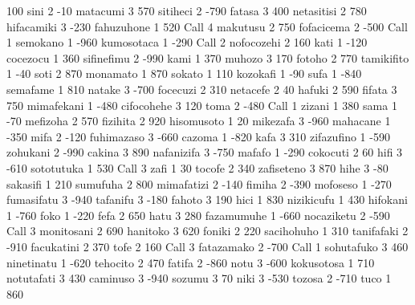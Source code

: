 100
sini 2 -10
matacumi 3 570
sitiheci 2 -790
fatasa 3 400
netasitisi 2 780
hifacamiki 3 -230
fahuzuhone 1 520
Call 4
makutusu 2 750
fofacicema 2 -500
Call 1
semokano 1 -960
kumosotaca 1 -290
Call 2
nofocozehi 2 160
kati 1 -120
cocezocu 1 360
sifinefimu 2 -990
kami 1 370
muhozo      3 170
fotoho      2 770
tamikifito  1 -40
soti        2 870
monamato    1 870
sokato      1 110
kozokafi    1 -90
sufa        1 -840
semafame    1 810
natake      3 -700
focecuzi    2 310
netacefe 2 40
hafuki 2 590
fifata 3 750
mimafekani 1 -480
cifocohehe 3 120
toma 2 -480
Call 1
zizani 1 380
sama 1 -70
mefizoha 2 570
fizihita 2 920
hisomusoto 1 20
mikezafa 3 -960
mahacane 1 -350
mifa 2 -120
fuhimazaso 3 -660
cazoma 1 -820
kafa 3 310
zifazufino 1 -590
zohukani 2 -990
cakina 3 890
nafanizifa 3 -750
mafafo 1 -290
cokocuti 2 60
hifi 3 -610
sototutuka 1 530
Call 3
zafi 1 30
tocofe 2 340
zafiseteno 3 870
hihe 3 -80
sakasifi 1 210
sumufuha 2 800
mimafatizi 2 -140
fimiha 2 -390
mofoseso 1 -270
fumasifatu 3 -940
tafanifu 3 -180
fahoto 3 190
hici 1 830
nizikicufu 1 430
hifokani 1 -760
foko 1 -220
fefa 2 650
hatu 3 280
fazamumuhe 1 -660
nocaziketu 2 -590
Call 3
monitosani 2 690
hanitoko 3 620
foniki 2 220
sacihohuho 1 310
tanifafaki 2 -910
facukatini 2 370
tofe 2 160
Call 3
fatazamako 2 -700
Call 1
sohutafuko 3 460
ninetinatu 1 -620
tehocito 2 470
fatifa 2 -860
notu 3 -600
kokusotosa 1 710
notutafati 3 430
caminuso 3 -940
sozumu 3 70
niki 3 -530
tozosa 2 -710
tuco 1 860 
